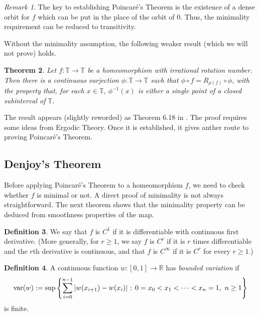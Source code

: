 \documentclass[12pt]{article}
\newtheorem{theorem}{Theorem}[section]
\theoremstyle{definition}
\newtheorem{definition}[theorem]{Definition}
\theoremstyle{remark}
\newtheorem{remark}[theorem]{Remark}
\begin{document}
\begin{remark}
    The key to establishing Poincar\'e's Theorem is the existence of a dense orbit for $f$ which can be put in the place of the orbit of $0$. Thus, the minimality requirement can be reduced to transitivity. 
\end{remark}

\medskip
Without the minimality assumption, the following weaker result (which we will not prove) holds.

\begin{theorem}\label{irr_sc_rotation}
Let $f : \mathbb T \to \mathbb T$ be a homeomorphism with irrational rotation number.
Then there is a continuous surjection $\phi : \mathbb T \to \mathbb T$ 
such that $\phi \circ f = R_{\rho(f)} \circ \phi$, with the property that, for each $x \in \mathbb T$,
$\phi^{-1}(x)$ is either a single point of a closed subinterval of $\mathbb T$.
\end{theorem}

The result appears (slightly reworded) as Theorem 6.18 in \cite{Walters}. 
The proof requires some ideas from Ergodic Theory. Once it is established, it gives anther route to proving Poincar\'e's Theorem.

\subsection{Denjoy's Theorem}
Before applying Poincar\'e's Theorem to a
homeomorphism $f$, we need to check whether $f$ is minimal or not. A direct proof
of minimality is not always straightforward. The next theorem shows that
the minimality property can be deduced from smoothness properties of the map.



\begin{definition} \label{cr}
We say that $f$ is $C^1$ if it is differentiable with continuous first derivative.
(More generally, for $r \ge1$, we say $f$ is $C^r$ if it is $r$ times differentiable and the
$r$th derivative is continuous, and that $f$ is $C^\infty$ if it is $C^r$ for every $r \ge 1$.)
\end{definition}

\begin{definition} \label{bounded_variation}
A continuous function $w : [0,1] \to \mathbb R$ has {\it bounded variation} if
\[
\mathrm{var}(w) := 
\sup\left\{\sum_{i=0}^{n-1} |w(x_{i+1})-w(x_i)|
\hbox{ : } 0=x_0 <x_1 < \cdots < x_n =1,
\ n \ge 1\right\}
\]
is finite.
\end{definition}
\end{document}
